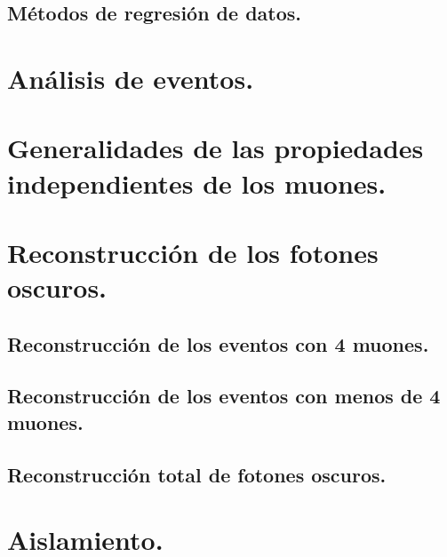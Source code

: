 \documentclass[12pt,english]{report}
\begin{document}
        \subsection{Métodos de regresión de datos.}
        \label{Cap_regresion}
    
	\section{Análisis de eventos.}
    
    
    \section{Generalidades de las propiedades independientes de los muones.}
    
    
	\section{Reconstrucción de los fotones oscuros.}
	
		\subsection{Reconstrucción de los eventos con 4 muones.}
		
		
		\subsection{Reconstrucción de los eventos con menos de 4 muones.}	
		
		
		\subsection{Reconstrucción total de fotones oscuros.}	
		

    
    \section{Aislamiento.}
    
\end{document}
